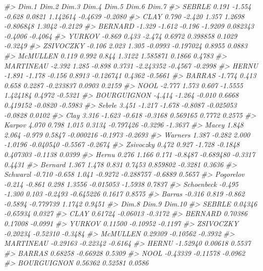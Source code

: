 \documentclass[]{book}
\newenvironment{Shaded}{\begin{snugshade}}{\end{snugshade}}
\newcommand{\CommentTok}[1]{\textcolor[rgb]{0.56,0.35,0.01}{\textit{#1}}}
\begin{document}
\begin{Shaded}
\begin{Highlighting}[]
\CommentTok{#>              Dim.1  Dim.2  Dim.3   Dim.4     Dim.5   Dim.6   Dim.7}
\CommentTok{#> SEBRLE       0.191 -1.554 -0.628  0.0821  1.142614 -0.4639 -0.2080}
\CommentTok{#> CLAY         0.790 -2.420  1.357  1.2698 -0.806848  1.3042 -0.2129}
\CommentTok{#> BERNARD     -1.329 -1.612 -0.196 -1.9209  0.082343 -0.4006 -0.4064}
\CommentTok{#> YURKOV      -0.869  0.433 -2.474  0.6972  0.398858  0.1029 -0.3249}
\CommentTok{#> ZSIVOCZKY   -0.106  2.023  1.305 -0.0993 -0.197024  0.8955  0.0883}
\CommentTok{#> McMULLEN     0.119  0.992  0.844  1.3122  1.585871  0.1866  0.4783}
\CommentTok{#> MARTINEAU   -2.392  1.285 -0.898  0.3731 -2.243352 -0.4567 -0.2998}
\CommentTok{#> HERNU       -1.891 -1.178 -0.156  0.8913 -0.126741  0.4362 -0.5661}
\CommentTok{#> BARRAS      -1.774  0.413  0.658  0.2287 -0.233837  0.0903  0.2159}
\CommentTok{#> NOOL        -2.777  1.573  0.607 -1.5555  1.424184  0.4972 -0.5321}
\CommentTok{#> BOURGUIGNON -4.414 -1.264 -0.010  0.6668  0.419152 -0.0820 -0.5983}
\CommentTok{#> Sebrle       3.451 -1.217 -1.678 -0.8087 -0.025053 -0.0828  0.0102}
\CommentTok{#> Clay         3.316 -1.623 -0.618 -0.3168  0.569165  0.7772  0.2575}
\CommentTok{#> Karpov       4.070  0.798  1.015  0.3134 -0.797426 -0.3296 -1.3637}
\CommentTok{#> Macey        1.848  2.064 -0.979  0.5847 -0.000216 -0.1973 -0.2693}
\CommentTok{#> Warners      1.387 -0.282  2.000 -1.0196 -0.040540 -0.5567 -0.2674}
\CommentTok{#> Zsivoczky    0.472  0.927 -1.728 -0.1848  0.407303 -0.1138  0.0399}
\CommentTok{#> Hernu        0.276  1.166  0.171 -0.8487 -0.689480 -0.3317  0.4431}
\CommentTok{#> Bernard      1.367  1.478  0.831  0.7453  0.859802 -0.3281  0.3636}
\CommentTok{#> Schwarzl    -0.710 -0.658  1.041 -0.9272 -0.288757 -0.6889  0.5657}
\CommentTok{#> Pogorelov   -0.214 -0.861  0.298  1.3556 -0.015053 -1.5938  0.7837}
\CommentTok{#> Schoenbeck  -0.495 -1.300  0.103 -0.2493 -0.645226  0.1617  0.8575}
\CommentTok{#> Barras      -0.316  0.819 -0.862 -0.5894 -0.779739  1.1742  0.9451}
\CommentTok{#>                Dim.8    Dim.9  Dim.10}
\CommentTok{#> SEBRLE       0.04346 -0.65934  0.0327}
\CommentTok{#> CLAY         0.61724 -0.06013 -0.3172}
\CommentTok{#> BERNARD      0.70386  0.17008 -0.0991}
\CommentTok{#> YURKOV       0.11500 -0.10952 -0.1197}
\CommentTok{#> ZSIVOCZKY   -0.20234 -0.52310 -0.3484}
\CommentTok{#> McMULLEN     0.29309 -0.10562 -0.3932}
\CommentTok{#> MARTINEAU   -0.29163 -0.22342 -0.6164}
\CommentTok{#> HERNU       -1.52940  0.00618  0.5537}
\CommentTok{#> BARRAS       0.68258 -0.66928  0.5309}
\CommentTok{#> NOOL        -0.43339 -0.11578 -0.0962}
\CommentTok{#> BOURGUIGNON  0.56362  0.52581  0.0586}

\end{Highlighting}
\end{Shaded}
\end{document}
